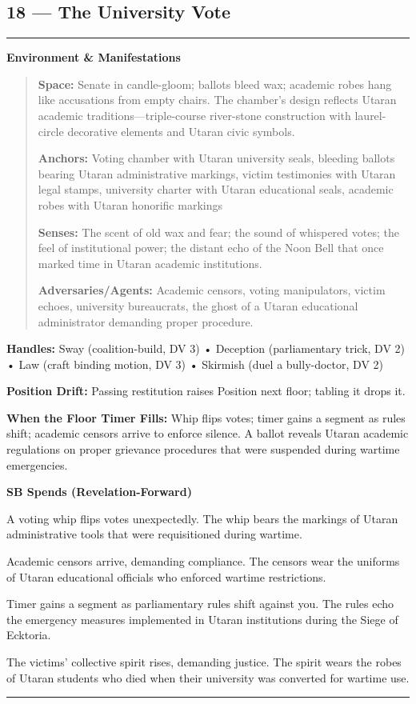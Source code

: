 \documentclass[18pt, letterpaper, twoside]{article}
\newenvironment{floorbox}[1]{%
    \begin{center}
    \begin{minipage}{0.95\textwidth}
    \subsection*{#1}
    \vspace{-0.5em}
    \rule{\textwidth}{0.5pt}
    \vspace{0.5em}
}{%
    \vspace{0.5em}
    \rule{\textwidth}{0.5pt}
    \end{minipage}
    \end{center}
}
\newenvironment{gmnote}[1]{%
    \vspace{0.5em}
    \noindent\textbf{#1}
    \begin{quote}
}{%
    \end{quote}
    \vspace{0.5em}
}
\newcommand{\handles}[1]{\noindent\textbf{Handles:} #1\par}
\newcommand{\sbitem}[2]{\item[#1 SB:] #2}
\begin{document}
\begin{floorbox}{18 --- The University Vote}
\begin{gmnote}{Environment \& Manifestations}
\textbf{Space:} Senate in candle-gloom; ballots bleed wax; academic robes hang like accusations from empty chairs. The chamber's design reflects Utaran academic traditions---triple-course river-stone construction with laurel-circle decorative elements and Utaran civic symbols.

\textbf{Anchors:} Voting chamber with Utaran university seals, bleeding ballots bearing Utaran administrative markings, victim testimonies with Utaran legal stamps, university charter with Utaran educational seals, academic robes with Utaran honorific markings

\textbf{Senses:} The scent of old wax and fear; the sound of whispered votes; the feel of institutional power; the distant echo of the Noon Bell that once marked time in Utaran academic institutions.

\textbf{Adversaries/Agents:} Academic censors, voting manipulators, victim echoes, university bureaucrats, the ghost of a Utaran educational administrator demanding proper procedure.
\end{gmnote}

\handles{Sway (coalition-build, DV 3) • Deception (parliamentary trick, DV 2) • Law (craft binding motion, DV 3) • Skirmish (duel a bully-doctor, DV 2)}

\textbf{Position Drift:} Passing restitution raises Position next floor; tabling it drops it.

\textbf{When the Floor Timer Fills:} Whip flips votes; timer gains a segment as rules shift; academic censors arrive to enforce silence. A ballot reveals Utaran academic regulations on proper grievance procedures that were suspended during wartime emergencies.

\textbf{SB Spends (Revelation-Forward)}
\begin{description}[leftmargin=*, style=unboxed]
    \sbitem{1}{A voting whip flips votes unexpectedly. The whip bears the markings of Utaran administrative tools that were requisitioned during wartime.}
    \sbitem{2}{Academic censors arrive, demanding compliance. The censors wear the uniforms of Utaran educational officials who enforced wartime restrictions.}
    \sbitem{3}{Timer gains a segment as parliamentary rules shift against you. The rules echo the emergency measures implemented in Utaran institutions during the Siege of Ecktoria.}
    \sbitem{4+}{The victims' collective spirit rises, demanding justice. The spirit wears the robes of Utaran students who died when their university was converted for wartime use.}
\end{description}


\end{floorbox}
\end{document}
